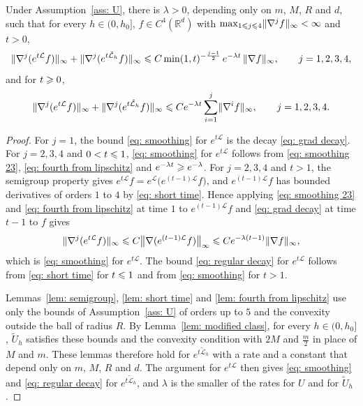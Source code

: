\begin{lemma}
\label{lem: smoothing}
    Under Assumption~\ref{ass: U}, there is $\lambda > 0$, depending only on $m$, $M$, $R$ and $d$, such that for every $h \in (0,h_0]$, $f \in C^4(\mathbb R^d)$ with $\max_{1 \leqslant j \leqslant 4} \lVert \nabla^j f \rVert_\infty < \infty$ and $t > 0$,
    \begin{equation}
        \lVert \nabla^j (e^{t\mathcal L} f) \rVert_\infty + \lVert \nabla^j (e^{t\tilde{\mathcal L}_h} f) \rVert_\infty \leqslant C \min(1,t)^{-\frac{j-1}{2}}\, e^{-\lambda t}\, \lVert \nabla f \rVert_\infty , \qquad j = 1, 2, 3, 4 ,
        \label{eq: smoothing}
    \end{equation}
    and for $t \geqslant 0$,
    \begin{equation}
        \lVert \nabla^j (e^{t\mathcal L} f) \rVert_\infty + \lVert \nabla^j (e^{t\tilde{\mathcal L}_h} f) \rVert_\infty \leqslant C e^{-\lambda t} \sum_{i=1}^{j} \lVert \nabla^i f \rVert_\infty , \qquad j = 1, 2, 3, 4 .
        \label{eq: regular decay}
    \end{equation}
\end{lemma}

\begin{proof}
    For $j = 1$, the bound \eqref{eq: smoothing} for $e^{t\mathcal L}$ is the decay \eqref{eq: grad decay}. For $j = 2, 3, 4$ and $0 < t \leqslant 1$, \eqref{eq: smoothing} for $e^{t\mathcal L}$ follows from \eqref{eq: smoothing 23}, \eqref{eq: fourth from lipschitz} and $e^{-\lambda t} \geqslant e^{-\lambda}$. For $j = 2, 3, 4$ and $t > 1$, the semigroup property gives $e^{t\mathcal L} f = e^{\mathcal L} \bigl( e^{(t-1)\mathcal L} f \bigr)$, and $e^{(t-1)\mathcal L} f$ has bounded derivatives of orders $1$ to $4$ by \eqref{eq: short time}. Hence applying \eqref{eq: smoothing 23} and \eqref{eq: fourth from lipschitz} at time $1$ to $e^{(t-1)\mathcal L} f$ and \eqref{eq: grad decay} at time $t - 1$ to $f$ gives
    \begin{equation*}
        \lVert \nabla^j (e^{t\mathcal L} f) \rVert_\infty \leqslant C \bigl\| \nabla (e^{(t-1)\mathcal L} f) \bigr\|_\infty \leqslant C e^{-\lambda (t-1)} \lVert \nabla f \rVert_\infty ,
    \end{equation*}
    which is \eqref{eq: smoothing} for $e^{t\mathcal L}$. The bound \eqref{eq: regular decay} for $e^{t\mathcal L}$ follows from \eqref{eq: short time} for $t \leqslant 1$ and from \eqref{eq: smoothing} for $t > 1$.

    Lemmas~\ref{lem: semigroup}, \ref{lem: short time} and \ref{lem: fourth from lipschitz} use only the bounds of Assumption~\ref{ass: U} of orders up to $5$ and the convexity outside the ball of radius $R$. By Lemma~\ref{lem: modified class}, for every $h \in (0, h_0]$, $\tilde U_h$ satisfies these bounds and the convexity condition with $2M$ and $\frac m2$ in place of $M$ and $m$. These lemmas therefore hold for $e^{t\tilde{\mathcal L}_h}$ with a rate and a constant that depend only on $m$, $M$, $R$ and $d$. The argument for $e^{t\mathcal L}$ then gives \eqref{eq: smoothing} and \eqref{eq: regular decay} for $e^{t\tilde{\mathcal L}_h}$, and $\lambda$ is the smaller of the rates for $U$ and for $\tilde U_h$.
\end{proof}

